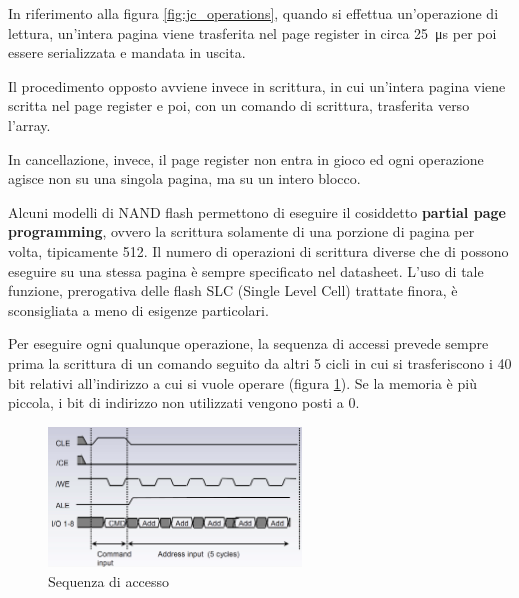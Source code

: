 \documentclass[11pt,4paper]{report}
\begin{document}
In riferimento alla figura \ref{fig:jc_operations}, quando si effettua un'operazione di lettura, un'intera pagina viene trasferita nel page register in circa \SI{25}{\micro\second} per poi essere serializzata e mandata in uscita.

Il procedimento opposto avviene invece in scrittura, in cui un'intera pagina viene scritta nel page register e poi, con un comando di scrittura, trasferita verso l'array.

In cancellazione, invece, il page register non entra in gioco ed ogni operazione agisce non su una singola pagina, ma su un intero blocco.

Alcuni modelli di NAND flash permettono di eseguire il cosiddetto \textbf{partial page programming}, ovvero la scrittura solamente di una porzione di pagina per volta, tipicamente \SI{512}{\byte}. Il numero di operazioni di scrittura diverse che di possono eseguire su una stessa pagina è sempre specificato nel datasheet. L'uso di tale funzione, prerogativa delle flash SLC (Single Level Cell) trattate finora, è sconsigliata a meno di esigenze particolari.

Per eseguire ogni qualunque operazione, la sequenza di accessi prevede sempre prima la scrittura di un comando seguito da altri 5 cicli in cui si trasferiscono i 40 bit relativi all'indirizzo a cui si vuole operare (figura \ref{fig:jc_access}). Se la memoria è più piccola, i bit di indirizzo non utilizzati vengono posti a 0.

\begin{figure}[hbtp]
	\centering
	\includegraphics[width=0.6\textwidth]{memorie/jc_access}
	\caption{Sequenza di accesso}
	\label{fig:jc_access}
\end{figure}
\end{document}
